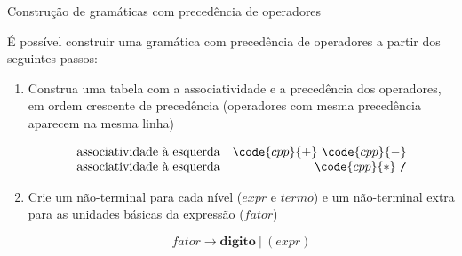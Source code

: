 \begin{frame}[fragile]{Construção de gramáticas com precedência de operadores}

    É possível construir uma gramática com precedência de operadores a partir dos seguintes passos:
    \pause

    \vspace{0.2in}

    \begin{enumerate}
        \item Construa uma tabela com a associatividade e a precedência dos operadores, em ordem crescente de precedência (operadores com mesma precedência 
            aparecem na mesma linha)
        \pause
        \begin{footnotesize}
        \[
            \begin{array}{lr}
                \mbox{associatividade à esquerda} & \code{cpp}{+}\ \code{cpp}{-} \\
                \mbox{associatividade à esquerda} & \code{cpp}{*}\ \texttt{/} \\
            \end{array}
        \]
        \end{footnotesize}
        \pause
       
        \item Crie um não-terminal para cada nível ($expr$ e $termo$) e um não-terminal extra para as unidades básicas da expressão ($fator$)
        \pause
        \begin{footnotesize}
        \[
            fator \to \mathbf{digito}\ |\ (expr)
        \]
        \end{footnotesize}
 
    \end{enumerate}

\end{frame}

